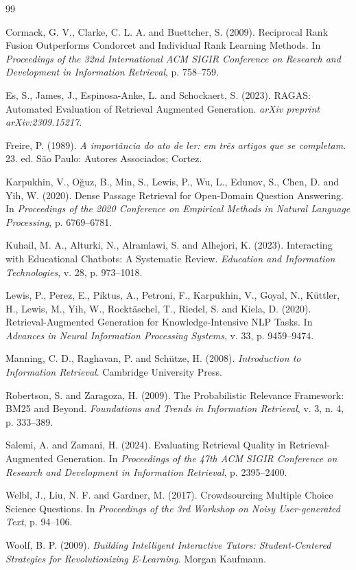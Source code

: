 \documentclass[12pt]{article}
\begin{document}
\begin{thebibliography}{99}

Cormack, G. V., Clarke, C. L. A. and Buettcher, S. (2009).
Reciprocal Rank Fusion Outperforms Condorcet and Individual Rank Learning
Methods. In \textit{Proceedings of the 32nd International ACM SIGIR
Conference on Research and Development in Information Retrieval}, p. 758--759.

Es, S., James, J., Espinosa-Anke, L. and Schockaert, S. (2023).
RAGAS: Automated Evaluation of Retrieval Augmented Generation.
\textit{arXiv preprint arXiv:2309.15217}.

Freire, P. (1989). \textit{A importância do ato de ler: em três artigos que
se completam}. 23. ed. São Paulo: Autores Associados; Cortez.

Karpukhin, V., O{\u{g}}uz, B., Min, S., Lewis, P., Wu, L., Edunov, S.,
Chen, D. and Yih, W. (2020). Dense Passage Retrieval for Open-Domain
Question Answering. In \textit{Proceedings of the 2020 Conference on
Empirical Methods in Natural Language Processing}, p. 6769--6781.

Kuhail, M. A., Alturki, N., Alramlawi, S. and Alhejori, K. (2023).
Interacting with Educational Chatbots: A Systematic Review.
\textit{Education and Information Technologies}, v. 28, p. 973--1018.

Lewis, P., Perez, E., Piktus, A., Petroni, F., Karpukhin, V., Goyal, N.,
K{\"u}ttler, H., Lewis, M., Yih, W., Rockt{\"a}schel, T., Riedel, S. and
Kiela, D. (2020). Retrieval-Augmented Generation for Knowledge-Intensive
NLP Tasks. In \textit{Advances in Neural Information Processing Systems},
v. 33, p. 9459--9474.

Manning, C. D., Raghavan, P. and Sch{\"u}tze, H. (2008).
\textit{Introduction to Information Retrieval}. Cambridge University Press.

Robertson, S. and Zaragoza, H. (2009). The Probabilistic Relevance
Framework: BM25 and Beyond. \textit{Foundations and Trends in Information
Retrieval}, v. 3, n. 4, p. 333--389.

Salemi, A. and Zamani, H. (2024). Evaluating Retrieval Quality in
Retrieval-Augmented Generation. In \textit{Proceedings of the 47th ACM
SIGIR Conference on Research and Development in Information Retrieval},
p. 2395--2400.

Welbl, J., Liu, N. F. and Gardner, M. (2017). Crowdsourcing Multiple
Choice Science Questions. In \textit{Proceedings of the 3rd Workshop on
Noisy User-generated Text}, p. 94--106.

Woolf, B. P. (2009). \textit{Building Intelligent Interactive Tutors:
Student-Centered Strategies for Revolutionizing E-Learning}. Morgan Kaufmann.

\end{thebibliography}
\end{document}
